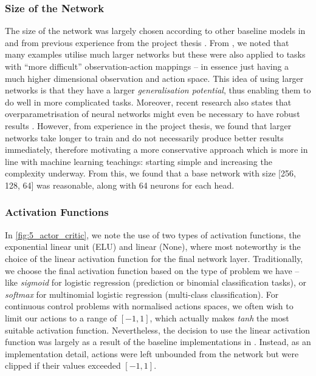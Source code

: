 \subsubsection{Size of the Network}
The size of the network was largely chosen according to other baseline models in \cite{IsaacGym} and from previous experience from the project thesis \cite{project_thesis}. From \cite{IsaacGym}, we noted that many examples utilise much larger networks but these were also applied to tasks with ``more difficult'' observation-action mappings \cite{shadowHand, AMPMotionPriors} -- in essence just having a much higher dimensional observation and action space.
This idea of using larger networks is that they have a larger \textit{generalisation potential}, thus enabling them to do well in more complicated tasks. Moreover, recent research also states that overparametrisation of neural networks might even be necessary to have robust results \cite{bubeck2021aLawOfRobustness}.
However, from experience in the project thesis, we found that larger networks take longer to train and do not necessarily produce better results immediately, therefore motivating a more conservative approach which is more in line with machine learning teachings: starting simple and increasing the complexity underway. From this, we found that a base network with size [256, 128, 64] was reasonable, along with 64 neurons for each head.

\subsubsection{Activation Functions}
In \cref{fig:5_actor_critic}, we note the use of two types of activation functions, the exponential linear unit (ELU) and linear (None), where most noteworthy is the choice of the linear activation function for the final network layer. Traditionally, we choose the final activation function based on the type of problem we have -- like \textit{sigmoid} for logistic regression (prediction or binomial classification tasks), or \textit{softmax} for multinomial logistic regression (multi-class classification). For continuous control problems with normalised actions spaces, we often wish to limit our actions to a range of $[-1, 1]$, which actually makes \textit{tanh} the most suitable activation function. Nevertheless, the decision to use the linear activation function was largely as a result of the baseline implementations in \cite{IsaacGym}. Instead, as an implementation detail, actions were left unbounded from the network but were clipped if their values exceeded $[-1, 1]$. 


